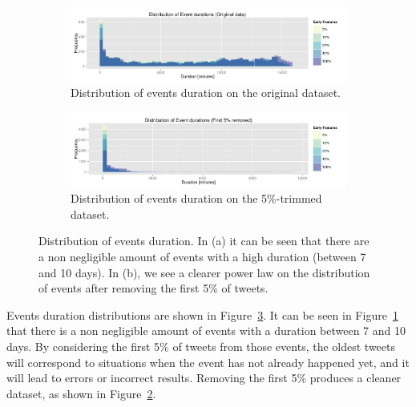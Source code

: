 \begin{figure}
  \centering
  \begin{subfigure}{\textwidth}
    \includegraphics[width=\textwidth]{figures/data/dist-events-durations-o.pdf}
    \caption[Distribution of events duration on the original
      dataset.]{Distribution of events duration on the original dataset.} 
    \label{sfig:dist-events-durations-o}
  \end{subfigure}

  \begin{subfigure}{\textwidth}
    \centering
    \includegraphics[width=\textwidth]{figures/data/dist-events-durations-5.pdf}
    \caption[Distribution of events duration on the 5\%-trimmed
      dataset.]{Distribution of events duration on the 5\%-trimmed dataset.} 
    \label{sfig:dist-events-durations-5}
  \end{subfigure}

  \caption[Distribution of events duration]{Distribution of events duration. In
    (a) it can be seen that there are a non negligible amount of events with a
    high duration (between 7 and 10 days). In (b), we see a clearer power law on
    the distribution of events after removing the first 5\% of tweets.}
  \label{fig:dist-events-durations}
\end{figure}

Events duration distributions are shown in
Figure~\ref{fig:dist-events-durations}. 
%
It can be seen in Figure~\ref{sfig:dist-events-durations-o} that there is a non
negligible amount of events with a duration between 7 and 10 days. 
%
By considering the first 5\% of tweets from those events, the oldest tweets will
correspond to situations when the event has not already happened yet, and it
will lead to errors or incorrect results. 
%
Removing the first 5\% produces a cleaner dataset, as shown in
Figure~\ref{sfig:dist-events-durations-5}.


